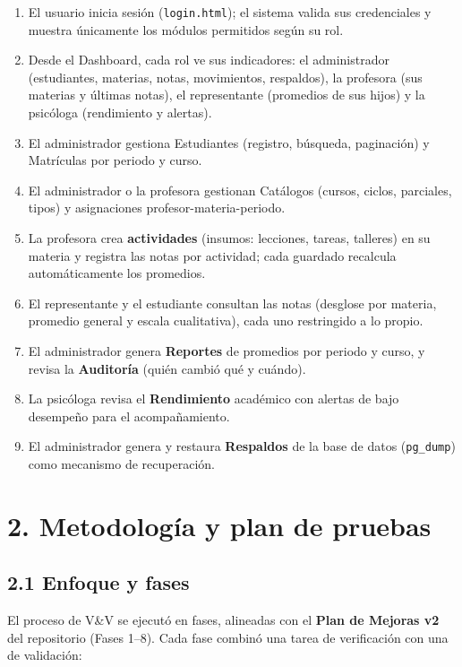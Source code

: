 \documentclass[11pt,a4paper]{article}
\begin{document}
\begin{enumerate}[leftmargin=*]
\item El usuario inicia sesión (\texttt{login.html}); el sistema valida sus credenciales y muestra únicamente los módulos permitidos según su rol.
\item Desde el Dashboard, cada rol ve sus indicadores: el administrador (estudiantes, materias, notas, movimientos, respaldos), la profesora (sus materias y últimas notas), el representante (promedios de sus hijos) y la psicóloga (rendimiento y alertas).
\item El administrador gestiona Estudiantes (registro, búsqueda, paginación) y Matrículas por periodo y curso.
\item El administrador o la profesora gestionan Catálogos (cursos, ciclos, parciales, tipos) y asignaciones profesor-materia-periodo.
\item La profesora crea \textbf{actividades} (insumos: lecciones, tareas, talleres) en su materia y registra las notas por actividad; cada guardado recalcula automáticamente los promedios.
\item El representante y el estudiante consultan las notas (desglose por materia, promedio general y escala cualitativa), cada uno restringido a lo propio.
\item El administrador genera \textbf{Reportes} de promedios por periodo y curso, y revisa la \textbf{Auditoría} (quién cambió qué y cuándo).
\item La psicóloga revisa el \textbf{Rendimiento} académico con alertas de bajo desempeño para el acompañamiento.
\item El administrador genera y restaura \textbf{Respaldos} de la base de datos (\texttt{pg\_dump}) como mecanismo de recuperación.
\end{enumerate}


\section*{2. Metodología y plan de pruebas}


\subsection*{2.1 Enfoque y fases}


El proceso de V\&V se ejecutó en fases, alineadas con el \textbf{Plan de Mejoras v2} del repositorio (Fases 1--8). Cada fase combinó una tarea de verificación con una de validación:
\end{document}
